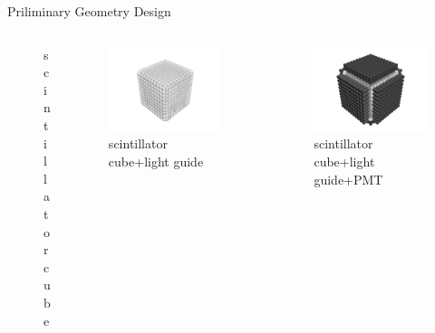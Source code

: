 \documentclass[11pt,compress,xcolor=x11names,UTF8]{beamer}
\begin{document}
\begin{frame}{Priliminary Geometry Design}
\begin{columns}
\begin{column}{.33\textwidth}
\begin{figure}
\caption{scintillator \qquad \qquad \qquad cube}
\end{figure}
\end{column}
\begin{column}{.33\textwidth}
\begin{figure}
\centering
\includegraphics[width=1.25\textwidth]{currentfig/geo2.png} %
\caption{scintillator cube+light guide}
\end{figure}
\end{column}
\begin{column}{.33\textwidth}
\begin{figure}
\centering
\includegraphics[width=1.2\textwidth]{currentfig/geo3.png} %
\caption{scintillator cube+light guide+PMT}
\end{figure}
\end{column}
\end{columns}
\end{frame}
\end{document}
